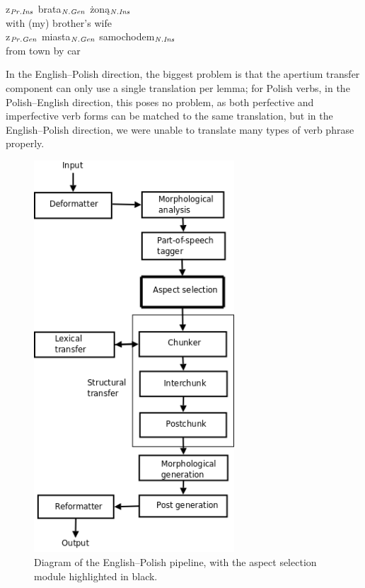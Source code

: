 \documentclass[11pt]{article}
\begin{document}
\begin{center}
\begin{table}[htdp]
z$_{\it Pr.Ins}$ brata$_{\it N.Gen}$ {\.{z}on\k{a}}$_{\it N.Ins}$ \\
with (my) brother's wife \\
z$_{\it Pr.Gen}$ miasta$_{\it N.Gen}$ samochodem$_{\it N.Ins}$\\
from town by car
\end{table}
\end{center}

In the English--Polish direction, the biggest problem is that the
apertium transfer component can only use a single translation per lemma;
for Polish verbs, in the Polish--English direction, this poses no problem,
as both perfective and imperfective verb forms can be matched to the
same translation, but in the English--Polish direction, we were unable to
translate many types of verb phrase properly.

\begin{figure}[pt]
\begin{center}
\includegraphics*[width=7.5cm]{aspectselect.png}
\end{center}
\caption{Diagram of the English--Polish pipeline, with the aspect selection
module highlighted in black.}
\label{figure:modules}
\end{figure}
\end{document}
